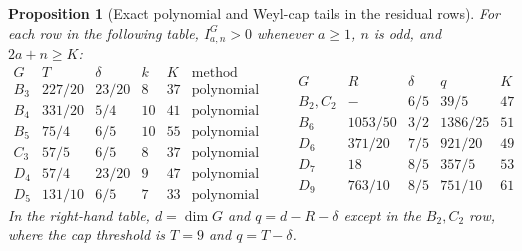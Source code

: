 \documentclass[11pt,reqno]{amsart}
\theoremstyle{plain}
\newtheorem{proposition}[theorem]{Proposition}
\theoremstyle{definition}
\begin{document}
\begin{proposition}[Exact polynomial and Weyl-cap tails in the residual rows]
\label{prop:bcd-remaining-exact-tails}
For each row in the following table, $I^G_{a,n}>0$ whenever $a\geq1$,
$n$ is odd, and $2a+n\geq K$:
\[
\begin{array}{c|rrrr|c}
G&T&\delta&k&K&\text{method}\\ \hline
B_3&227/20&23/20&8&37&\text{polynomial}\\
B_4&331/20&5/4&10&41&\text{polynomial}\\
B_5&75/4&6/5&10&55&\text{polynomial}\\
C_3&57/5&6/5&8&37&\text{polynomial}\\
D_4&57/4&23/20&9&47&\text{polynomial}\\
D_5&131/10&6/5&7&33&\text{polynomial}
\end{array}
\qquad
\begin{array}{c|rrrr}
G&R&\delta&q&K\\ \hline
B_2,C_2&-&6/5&39/5&47\\
B_6&1053/50&3/2&1386/25&51\\
D_6&371/20&7/5&921/20&49\\
D_7&18&8/5&357/5&53\\
D_9&763/10&8/5&751/10&61
\end{array}
\]
In the right-hand table, $d=\dim G$ and $q=d-R-\delta$ except in the
$B_2,C_2$ row, where the cap threshold is $T=9$ and $q=T-\delta$.
\end{proposition}
\end{document}
